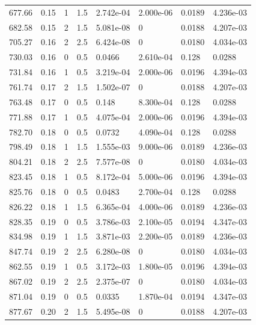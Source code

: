 \documentclass[preview]{standalone}
\begin{document}
{{\begin{tabular}{L{1.2cm}C{1.2cm} C{0.3cm}C{0.5cm} C{1.4cm}C{1.4cm} C{1.4cm}C{1.4cm}}
  677.66  &  0.15  & 1     & 1.5 &  2.742e-04  & 2.000e-06  & 0.0189 &  4.236e-03   \\ 
  682.58  &  0.15  & 2     & 1.5 &  5.081e-08  & 0  & 0.0188 &  4.207e-03   \\ 
  705.27  &  0.16  & 2     & 2.5 &  6.424e-08  & 0  & 0.0180 &  4.034e-03   \\ 
  730.03  &  0.16  & 0     & 0.5 &  0.0466  & 2.610e-04  & 0.128 &  0.0288   \\ 
  731.84  &  0.16  & 1     & 0.5 &  3.219e-04  & 2.000e-06  & 0.0196 &  4.394e-03   \\ 
  761.74  &  0.17  & 2     & 1.5 &  1.502e-07  & 0  & 0.0188 &  4.207e-03   \\ 
  763.48  &  0.17  & 0     & 0.5 &  0.148  & 8.300e-04  & 0.128 &  0.0288   \\ 
  771.88  &  0.17  & 1     & 0.5 &  4.075e-04  & 2.000e-06  & 0.0196 &  4.394e-03   \\ 
  782.70  &  0.18  & 0     & 0.5 &  0.0732  & 4.090e-04  & 0.128 &  0.0288   \\ 
  798.49  &  0.18  & 1     & 1.5 &  1.555e-03  & 9.000e-06  & 0.0189 &  4.236e-03   \\ 
  804.21  &  0.18  & 2     & 2.5 &  7.577e-08  & 0  & 0.0180 &  4.034e-03   \\ 
  823.45  &  0.18  & 1     & 0.5 &  8.172e-04  & 5.000e-06  & 0.0196 &  4.394e-03   \\ 
  825.76  &  0.18  & 0     & 0.5 &  0.0483  & 2.700e-04  & 0.128 &  0.0288   \\ 
  826.22  &  0.18  & 1     & 1.5 &  6.365e-04  & 4.000e-06  & 0.0189 &  4.236e-03   \\ 
  828.35  &  0.19  & 0     & 0.5 &  3.786e-03  & 2.100e-05  & 0.0194 &  4.347e-03   \\ 
  834.98  &  0.19  & 1     & 1.5 &  3.871e-03  & 2.200e-05  & 0.0189 &  4.236e-03   \\ 
  847.74  &  0.19  & 2     & 2.5 &  6.280e-08  & 0  & 0.0180 &  4.034e-03   \\ 
  862.55  &  0.19  & 1     & 0.5 &  3.172e-03  & 1.800e-05  & 0.0196 &  4.394e-03   \\ 
  867.02  &  0.19  & 2     & 2.5 &  2.375e-07  & 0  & 0.0180 &  4.034e-03   \\ 
  871.04  &  0.19  & 0     & 0.5 &  0.0335  & 1.870e-04  & 0.0194 &  4.347e-03   \\ 
  877.67  &  0.20  & 2     & 1.5 &  5.495e-08  & 0  & 0.0188 &  4.207e-03   \\ 

\end{tabular}}}
\end{document}
